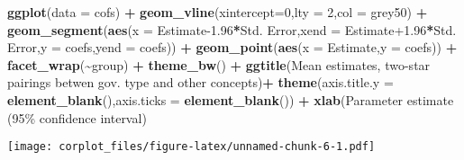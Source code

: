 \documentclass[
]{article}
\newenvironment{Shaded}{\begin{snugshade}}{\end{snugshade}}
\newcommand{\DataTypeTok}[1]{\textcolor[rgb]{0.13,0.29,0.53}{#1}}
\newcommand{\DecValTok}[1]{\textcolor[rgb]{0.00,0.00,0.81}{#1}}
\newcommand{\FloatTok}[1]{\textcolor[rgb]{0.00,0.00,0.81}{#1}}
\newcommand{\KeywordTok}[1]{\textcolor[rgb]{0.13,0.29,0.53}{\textbf{#1}}}
\newcommand{\NormalTok}[1]{#1}
\newcommand{\OperatorTok}[1]{\textcolor[rgb]{0.81,0.36,0.00}{\textbf{#1}}}
\newcommand{\StringTok}[1]{\textcolor[rgb]{0.31,0.60,0.02}{#1}}
\begin{document}
\begin{Shaded}
\begin{Highlighting}[]
\KeywordTok{ggplot}\NormalTok{(}\DataTypeTok{data =}\NormalTok{ cofs) }\OperatorTok{+}\StringTok{ }
\StringTok{  }\KeywordTok{geom\_vline}\NormalTok{(}\DataTypeTok{xintercept=}\DecValTok{0}\NormalTok{,}\DataTypeTok{lty =} \DecValTok{2}\NormalTok{,}\DataTypeTok{col =} \StringTok{\textquotesingle{}grey50\textquotesingle{}}\NormalTok{) }\OperatorTok{+}\StringTok{ }
\StringTok{  }\KeywordTok{geom\_segment}\NormalTok{(}\KeywordTok{aes}\NormalTok{(}\DataTypeTok{x =}\NormalTok{ Estimate}\FloatTok{{-}1.96}\OperatorTok{*}\StringTok{\textasciigrave{}}\DataTypeTok{Std. Error}\StringTok{\textasciigrave{}}\NormalTok{,}\DataTypeTok{xend =}\NormalTok{ Estimate}\FloatTok{+1.96}\OperatorTok{*}\StringTok{\textasciigrave{}}\DataTypeTok{Std. Error}\StringTok{\textasciigrave{}}\NormalTok{,}\DataTypeTok{y =}\NormalTok{ coefs,}\DataTypeTok{yend =}\NormalTok{ coefs)) }\OperatorTok{+}
\StringTok{  }\KeywordTok{geom\_point}\NormalTok{(}\KeywordTok{aes}\NormalTok{(}\DataTypeTok{x =}\NormalTok{ Estimate,}\DataTypeTok{y =}\NormalTok{ coefs))  }\OperatorTok{+}
\StringTok{  }\KeywordTok{facet\_wrap}\NormalTok{(}\OperatorTok{\textasciitilde{}}\NormalTok{group) }\OperatorTok{+}\StringTok{ }\KeywordTok{theme\_bw}\NormalTok{() }\OperatorTok{+}\StringTok{ }
\StringTok{  }\KeywordTok{ggtitle}\NormalTok{(}\StringTok{\textquotesingle{}Mean estimates, two{-}star pairings betwen gov. type and other concepts\textquotesingle{}}\NormalTok{)}\OperatorTok{+}\StringTok{ }\KeywordTok{theme}\NormalTok{(}\DataTypeTok{axis.title.y =} \KeywordTok{element\_blank}\NormalTok{(),}\DataTypeTok{axis.ticks =} \KeywordTok{element\_blank}\NormalTok{()) }\OperatorTok{+}
\StringTok{  }\KeywordTok{xlab}\NormalTok{(}\StringTok{\textquotesingle{}Parameter estimate (95\% confidence interval\textquotesingle{}}\NormalTok{)}
\end{Highlighting}
\end{Shaded}

\texttt{[image: corplot\_files/figure-latex/unnamed-chunk-6-1.pdf]}
\end{document}
